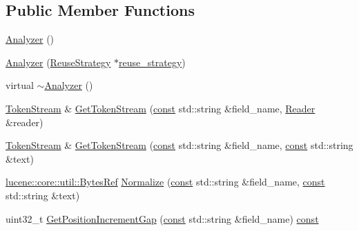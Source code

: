 \subsection*{Public Member Functions}
\begin{DoxyCompactItemize}
\item 
\mbox{\hyperlink{classlucene_1_1core_1_1analysis_1_1Analyzer_a1be2ff17bba265bdef6e1b44748eaf96}{Analyzer}} ()
\item 
\mbox{\hyperlink{classlucene_1_1core_1_1analysis_1_1Analyzer_ae9dc5c7b575e336b14185cf403003bba}{Analyzer}} (\mbox{\hyperlink{classlucene_1_1core_1_1analysis_1_1Analyzer_1_1ReuseStrategy}{Reuse\+Strategy}} $\ast$\mbox{\hyperlink{classlucene_1_1core_1_1analysis_1_1Analyzer_a8c0924436e0392015b0b3df59d35717c}{reuse\+\_\+strategy}})
\item 
virtual \mbox{\hyperlink{classlucene_1_1core_1_1analysis_1_1Analyzer_afa899ac3a6aabbe59f791f69368ad740}{$\sim$\+Analyzer}} ()
\item 
\mbox{\hyperlink{classlucene_1_1core_1_1analysis_1_1TokenStream}{Token\+Stream}} \& \mbox{\hyperlink{classlucene_1_1core_1_1analysis_1_1Analyzer_a010cdb318b51c27c46b8cbf5a1cfe20e}{Get\+Token\+Stream}} (\mbox{\hyperlink{ZlibCrc32_8h_a2c212835823e3c54a8ab6d95c652660e}{const}} std\+::string \&field\+\_\+name, \mbox{\hyperlink{classlucene_1_1core_1_1analysis_1_1Reader}{Reader}} \&reader)
\item 
\mbox{\hyperlink{classlucene_1_1core_1_1analysis_1_1TokenStream}{Token\+Stream}} \& \mbox{\hyperlink{classlucene_1_1core_1_1analysis_1_1Analyzer_a385dbda39ff79997402b35ddbb296697}{Get\+Token\+Stream}} (\mbox{\hyperlink{ZlibCrc32_8h_a2c212835823e3c54a8ab6d95c652660e}{const}} std\+::string \&field\+\_\+name, \mbox{\hyperlink{ZlibCrc32_8h_a2c212835823e3c54a8ab6d95c652660e}{const}} std\+::string \&text)
\item 
\mbox{\hyperlink{classlucene_1_1core_1_1util_1_1BytesRef}{lucene\+::core\+::util\+::\+Bytes\+Ref}} \mbox{\hyperlink{classlucene_1_1core_1_1analysis_1_1Analyzer_aff90a96fce2aa5ab99c6c2a880849812}{Normalize}} (\mbox{\hyperlink{ZlibCrc32_8h_a2c212835823e3c54a8ab6d95c652660e}{const}} std\+::string \&field\+\_\+name, \mbox{\hyperlink{ZlibCrc32_8h_a2c212835823e3c54a8ab6d95c652660e}{const}} std\+::string \&text)
\item 
uint32\+\_\+t \mbox{\hyperlink{classlucene_1_1core_1_1analysis_1_1Analyzer_a97cced949f5cfd3e4527b82fc178fa42}{Get\+Position\+Increment\+Gap}} (\mbox{\hyperlink{ZlibCrc32_8h_a2c212835823e3c54a8ab6d95c652660e}{const}} std\+::string \&field\+\_\+name) \mbox{\hyperlink{ZlibCrc32_8h_a2c212835823e3c54a8ab6d95c652660e}{const}}

\end{DoxyCompactItemize}
